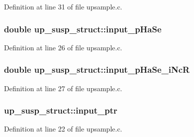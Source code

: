 Definition at line 31 of file upsample.\+c.

\subsubsection[{\texorpdfstring{input\+\_\+p\+Ha\+Se}{input_pHaSe}}]{\setlength{\rightskip}{0pt plus 5cm}double up\+\_\+susp\+\_\+struct\+::input\+\_\+p\+Ha\+Se}\hypertarget{structup__susp__struct_ac8e3b17dd0b21abf82deea33e4608df7}{}\label{structup__susp__struct_ac8e3b17dd0b21abf82deea33e4608df7}


Definition at line 26 of file upsample.\+c.

\subsubsection[{\texorpdfstring{input\+\_\+p\+Ha\+Se\+\_\+i\+NcR}{input_pHaSe_iNcR}}]{\setlength{\rightskip}{0pt plus 5cm}double up\+\_\+susp\+\_\+struct\+::input\+\_\+p\+Ha\+Se\+\_\+i\+NcR}\hypertarget{structup__susp__struct_a1ff0bf96af95e79536fe18284795895b}{}\label{structup__susp__struct_a1ff0bf96af95e79536fe18284795895b}


Definition at line 27 of file upsample.\+c.

\subsubsection[{\texorpdfstring{input\+\_\+ptr}{input_ptr}}]{ up\+\_\+susp\+\_\+struct\+::input\+\_\+ptr}\hypertarget{structup__susp__struct_aba107cdef9e48f54b88fbf4d2b59b686}{}\label{structup__susp__struct_aba107cdef9e48f54b88fbf4d2b59b686}


Definition at line 22 of file upsample.\+c.

